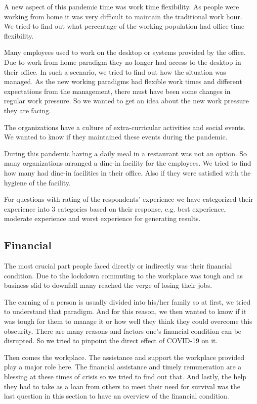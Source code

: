 \documentclass[11pt]{article}
\begin{document}
A new aspect of this pandemic time was work time flexibility. As people were working from home it was very difficult to maintain the traditional work hour. We tried to find out what percentage of the working population had office time flexibility. 

Many employees used to work on the desktop or systems provided by the office. Due to work from home paradigm they no longer had access to the desktop in their office. In such a scenario, we tried to find out how the situation was managed. 
As the new working paradigms had flexible work times and different expectations from the management, there must have been some changes in regular work pressure. So we wanted to get an idea about the new work pressure they are facing.

The organizations have a culture of extra-curricular activities and social events. We wanted to know if they maintained these events during the pandemic.

During this pandemic having a daily meal in a restaurant was not an option. So many organizations arranged a dine-in facility for the employees. We tried to find how many had dine-in facilities in their office. Also if they were satisfied with the hygiene of the facility.

For questions with rating of the respondents' experience we have categorized their experience into 3 categories based on their response, e.g. best experience, moderate experience and worst experience for generating results. 

\subsection {Financial}
The most crucial part people faced directly or indirectly was their financial condition. Due to the lockdown commuting to the workplace was tough and as business slid to downfall many reached the verge of losing their jobs.

The earning of a person is usually divided into his/her family so at first, we tried to understand that paradigm. And for this reason, we then wanted to know if it was tough for them to manage it or how well they think they could overcome this obscurity. There are many reasons and factors one's financial condition can be disrupted. So we tried to pinpoint the direct effect of COVID-19 on it. 

Then comes the workplace. The assistance and support the workplace provided play a major role here. The financial assistance and timely remuneration are a blessing at these times of crisis so we tried to find out that. And lastly, the help they had to take as a loan from others to meet their need for survival was the last question in this section to have an overview of the financial condition.
\end{document}
